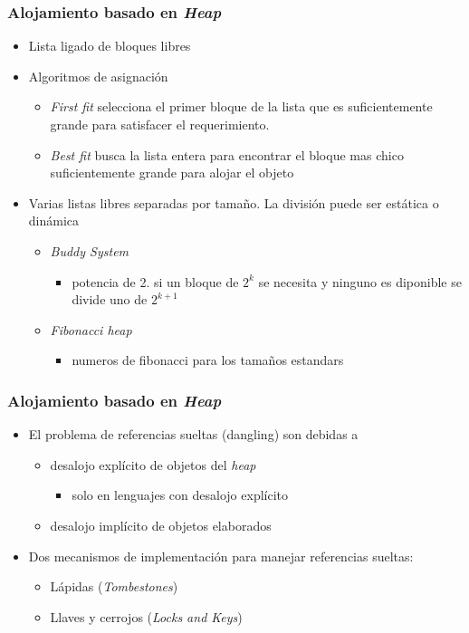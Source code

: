 \documentclass[11pt]{article}
\begin{document}
\subsubsection*{Alojamiento basado en \emph{Heap}}
\label{sec:orgheadline11}
\begin{itemize}
\item Lista ligado de bloques libres
\item Algoritmos de asignación
\begin{itemize}
\item \emph{First fit} selecciona el primer bloque de la lista que es
suficientemente grande para satisfacer el requerimiento.
\item \emph{Best fit} busca la lista entera para encontrar el bloque mas
chico suficientemente grande para alojar el objeto
\end{itemize}
\item Varias listas libres separadas por tamaño. La división puede ser
estática o dinámica
\begin{itemize}
\item \emph{Buddy System} 
\begin{itemize}
\item potencia de 2. si un bloque de \(2^k\) se necesita y ninguno es
diponible se divide uno de \(2^{k+1}\)
\end{itemize}
\item \emph{Fibonacci heap}
\begin{itemize}
\item numeros de fibonacci para los tamaños estandars
\end{itemize}
\end{itemize}
\end{itemize}


\subsubsection*{Alojamiento basado en \emph{Heap}}
\label{sec:orgheadline12}
\begin{itemize}
\item El problema de referencias sueltas (dangling) son debidas a
\begin{itemize}
\item desalojo explícito de objetos del \emph{heap}
\begin{itemize}
\item solo en lenguajes con desalojo explícito
\end{itemize}
\item desalojo implícito de objetos elaborados
\end{itemize}
\item Dos mecanismos de implementación para manejar referencias sueltas:
\begin{itemize}
\item Lápidas (\emph{Tombestones})
\item Llaves y cerrojos (\emph{Locks and Keys})
\end{itemize}
\end{itemize}
\end{document}
